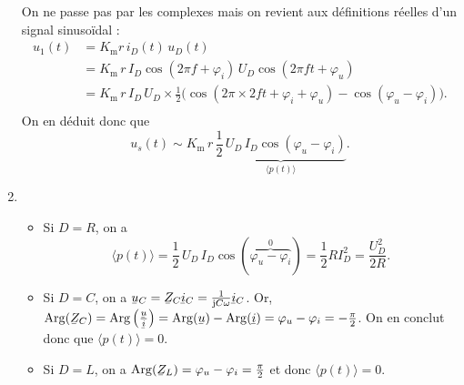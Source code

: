 \begin{enumerate}
		{\color{red} On ne passe pas par les complexes} mais on revient aux définitions réelles d'un signal sinusoïdal :
		\begin{align*}
			u_1(t) &= K_\text{m} r\,i_D(t)\,u_D(t) \\
			&= K_\text{m}\,r\,I_D\cos(2\pi f + \varphi_i)\,U_D \cos(2\pi f t + \varphi_u) \\
			&= K_\text{m}\,r\,I_D\,U_D \times \frac{1}{2}\Big(\cos(2\pi\times 2f t + \varphi_i + \varphi_u) - \cos(\varphi_u - \varphi_i)\Big). \\
		\end{align*}
		On en déduit donc que \[
			u_s(t) \sim K_\text{m}\,r\,\underbrace{\frac{1}{2}\,U_D\,I_D\cos(\varphi_u - \varphi_i)}_{\langle p(t)\rangle}
		.\]
	\item
		\begin{itemize}
			\item Si $D = R$, on a
				\[
					\langle p(t) \rangle = \frac{1}{2}\,U_D\,I_D \cos(\overbrace{\varphi_u - \varphi_i}^{0}) = \frac{1}{2} R I_D^2 = \frac{U_D^2}{2R}
				.\] 
			\item Si $D = C$, on a $\ubar{u}_C = \ubar{Z}_C \ubar{i}_C = \frac{1}{\mathrm{j}C\omega} \ubar{i}_C$. Or, $\Arg(\ubar{Z}_C) = \Arg\left( \frac{\ubar{u}}{\ubar{i}} \right) = \Arg(\ubar{u}) - \Arg(\ubar{i}) = \varphi_u - \varphi_i = -\frac{\pi}{2}$. On en conclut donc que $\langle p(t) \rangle = 0$.
			\item Si $D = L$, on a $\Arg(\ubar{Z}_L) = \varphi_u - \varphi_i = \frac{\pi}{2}$\/ et donc $\langle p(t) \rangle  = 0$.
		\end{itemize}
\end{enumerate}

